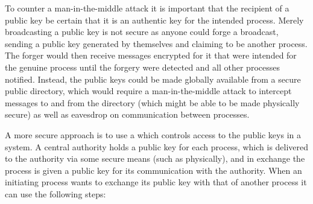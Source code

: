 To counter a man-in-the-middle attack it is important that the recipient
of a public key be certain that it is an authentic key for the intended
process. Merely broadcasting a public key is not secure as anyone could
forge a broadcast, sending a public key generated by themselves and
claiming to be another process. The forger would then receive messages
encrypted for it that were intended for the genuine process until the
forgery were detected and all other processes notified.
Instead, the public keys could be made globally available from a
secure public directory, which would require a man-in-the-middle attack to
intercept messages to and from the directory (which might be able to be made
physically secure) as well as eavesdrop on communication between
processes.

A more secure approach is to use a  which
controls access to the public keys in a system.
A central authority holds a public key for each process, which is
delivered to the authority via some secure means (such as physically),
and in exchange the process is given a public key for its communication
with the authority.
When an initiating process wants to exchange its public key with that
of another process it can use the following steps:
